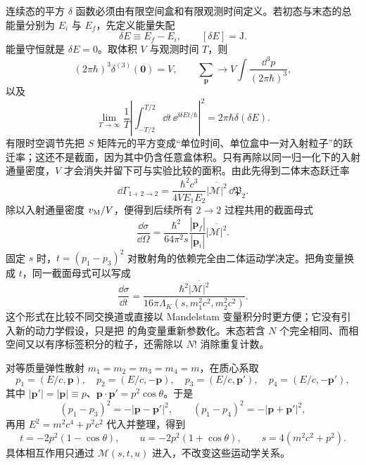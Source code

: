 连续态的平方 \(\delta\) 函数必须由有限空间盒和有限观测时间定义。若初态与末态的总能量分别为 $E_i$ 与 $E_f$，先定义能量失配
\begin{equation*}
 \delta E\equiv E_f-E_i,\qquad [\delta E]=\mathrm J.
\end{equation*}
能量守恒就是 $\delta E=0$。取体积 \(V\) 与观测时间 \(T\)，则
\begin{equation}
 (2\pi\hbar)^3\delta^{(3)}(\mathbf0)=V,
 \qquad
 \sum_{\mathbf p}\longrightarrow
 V\int\frac{\dd^3 p}{(2\pi\hbar)^3},
 \label{eq:box-delta-density-r15}
\end{equation}
以及
\begin{equation}
 \lim_{T\to\infty}\frac1T
 \left|\int_{-T/2}^{T/2}\dd t\,\ee^{\ii\delta E t/\hbar}\right|^2
 =2\pi\hbar\delta(\delta E).
 \label{eq:delta-square-time-r15}
\end{equation}
有限时空调节先把 $S$ 矩阵元的平方变成“单位时间、单位盒中一对入射粒子”的跃迁率；这还不是截面，因为其中仍含任意盒体积。只有再除以同一归一化下的入射通量密度，$V$ 才会消失并留下可与实验比较的面积。由此先得到二体末态跃迁率
\begin{equation}
 \boxed{
 \dd\Gamma_{1+2\to2}
 =\frac{\hbar^2c^3}{4VE_1E_2}
 \overline{|\mathcal M|^2}\,\dd\mathfrak P_2.}
 \label{eq:box-transition-rate-r15}
\end{equation}
除以入射通量密度 \(v_{\rm M}/V\)，便得到后续所有 \(2\to2\) 过程共用的截面母式
\begin{equation}
 \boxed{
 \frac{\dd\sigma}{\dd\Omega}
 =\frac{\hbar^2}{64\pi^2s}
 \frac{|\mathbf p_f|}{|\mathbf p_i|}
 \overline{|\mathcal M|^2}.}
 \label{eq:2to2-cross-section-master-si-r9}
\end{equation}
固定 \(s\) 时，\(t=(p_1-p_3)^2\) 对散射角的依赖完全由二体运动学决定。把角变量换成 \(t\)，同一截面母式可以写成
\begin{equation}
 \boxed{
 \frac{\dd\sigma}{\dd t}
 =\frac{\hbar^2\overline{|\mathcal M|^2}}
 {16\pi\Lambda_K(s,m_1^2c^2,m_2^2c^2)}.}
 \label{eq:2to2-dsigma-dt-si-r68}
\end{equation}
这个形式在比较不同交换道或直接以 Mandelstam 变量积分时更方便；它没有引入新的动力学假设，只是把 的角变量重新参数化。末态若含 \(N\) 个完全相同、而相空间又以有序标签积分的粒子，还需除以 \(N!\) 消除重复计数。

对等质量弹性散射 \(m_1=m_2=m_3=m_4=m\)，在质心系取
\begin{equation*}
p_1=(E/c,\mathbf p),\quad p_2=(E/c,-\mathbf p),\quad
p_3=(E/c,\mathbf p'),\quad p_4=(E/c,-\mathbf p'),
\end{equation*}
其中 $|\mathbf p'|=|\mathbf p|\equiv p$、$\mathbf p\cdot\mathbf p'=p^2\cos\theta$。于是
\begin{equation*}
(p_1-p_3)^2=-|\mathbf p-\mathbf p'|^2,
\qquad
(p_1-p_4)^2=-|\mathbf p+\mathbf p'|^2,
\end{equation*}
再用 $E^2=m^2c^4+p^2c^2$ 代入并整理，得到
\begin{equation}
 \boxed{
 t=-2p^2(1-\cos\theta),
 \qquad
 u=-2p^2(1+\cos\theta),
 \qquad
 s=4(m^2c^2+p^2).}
 \label{eq:t-u-cm-equalmass-si-r9}
\end{equation}
具体相互作用只通过 \(\mathcal M(s,t,u)\) 进入，不改变这些运动学关系。


